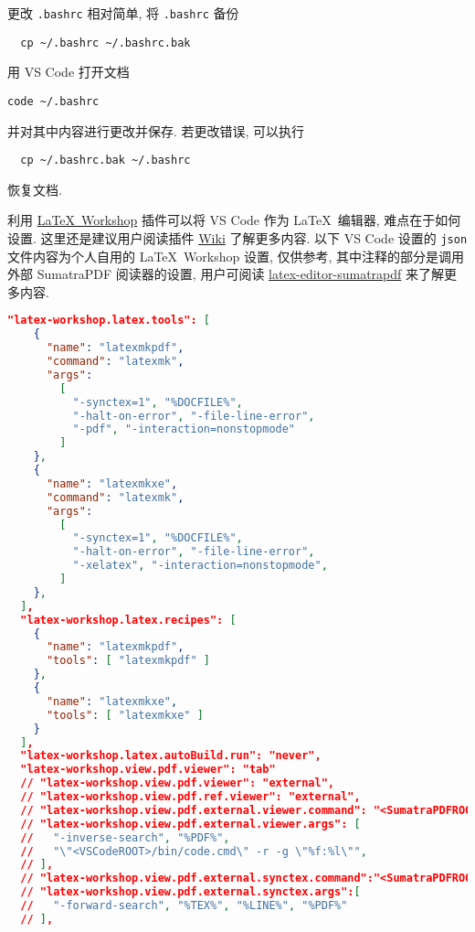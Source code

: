 更改 \texttt{.bashrc} 相对简单,
将 \texttt{.bashrc} 备份
\begin{lstlisting}
  cp ~/.bashrc ~/.bashrc.bak
\end{lstlisting}
用 VS Code 打开文档
\begin{lstlisting}[morekeywords = code]
  code ~/.bashrc
\end{lstlisting}
并对其中内容进行更改并保存.
若更改错误,
可以执行
\begin{lstlisting}
  cp ~/.bashrc.bak ~/.bashrc
\end{lstlisting}
恢复文档.

利用
\href{https://marketplace.visualstudio.com/items?itemName=James-Yu.latex-workshop}{\LaTeX\ Workshop}
插件可以将 VS Code 作为 \LaTeX\ 编辑器,
难点在于如何设置.
这里还是建议用户阅读插件
\href{https://github.com/James-Yu/LaTeX-Workshop/wiki}{Wiki}
了解更多内容.
以下 VS Code 设置的 \texttt{json} 文件内容为个人自用的 \LaTeX\ Workshop 设置,
仅供参考,
其中注释的部分是调用外部 SumatraPDF 阅读器的设置,
用户可阅读
\href{https://github.com/OsbertWang/latex-editor-sumatrapdf}{\textsf{latex-editor-sumatrapdf}}
来了解更多内容.
\begin{lstlisting}[language = json]
  "latex-workshop.latex.tools": [
    {
      "name": "latexmkpdf",
      "command": "latexmk",
      "args":
        [
          "-synctex=1", "%DOCFILE%",
          "-halt-on-error", "-file-line-error",
          "-pdf", "-interaction=nonstopmode"
        ]
    },
    {
      "name": "latexmkxe",
      "command": "latexmk",
      "args":
        [
          "-synctex=1", "%DOCFILE%",
          "-halt-on-error", "-file-line-error",
          "-xelatex", "-interaction=nonstopmode",
        ]
    },
  ],
  "latex-workshop.latex.recipes": [
    {
      "name": "latexmkpdf",
      "tools": [ "latexmkpdf" ]
    },
    {
      "name": "latexmkxe",
      "tools": [ "latexmkxe" ]
    }
  ],
  "latex-workshop.latex.autoBuild.run": "never",
  "latex-workshop.view.pdf.viewer": "tab"
  // "latex-workshop.view.pdf.viewer": "external",
  // "latex-workshop.view.pdf.ref.viewer": "external",
  // "latex-workshop.view.pdf.external.viewer.command": "<SumatraPDFROOT>/SumatraPDF.exe",
  // "latex-workshop.view.pdf.external.viewer.args": [
  //   "-inverse-search", "%PDF%",
  //   "\"<VSCodeROOT>/bin/code.cmd\" -r -g \"%f:%l\"",
  // ],
  // "latex-workshop.view.pdf.external.synctex.command":"<SumatraPDFROOT>/SumatraPDF.exe",
  // "latex-workshop.view.pdf.external.synctex.args":[
  //   "-forward-search", "%TEX%", "%LINE%", "%PDF%"
  // ],
\end{lstlisting}

